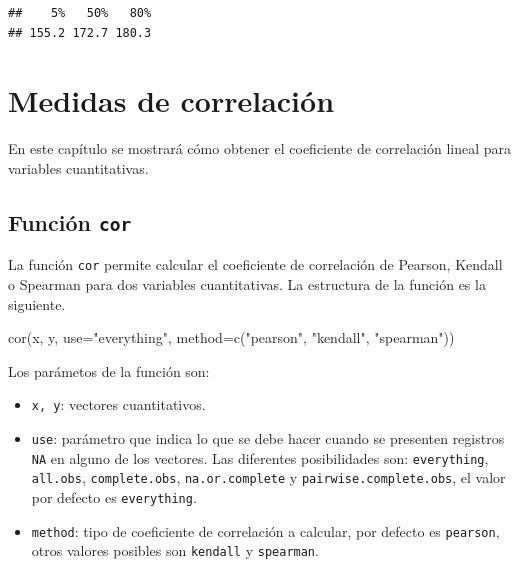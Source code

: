 \documentclass[
]{book}
\makeatletter
\newenvironment{Shaded}{\begin{snugshade}}{\end{snugshade}}
\newcommand{\AttributeTok}[1]{\textcolor[rgb]{0.77,0.63,0.00}{#1}}
\newcommand{\FloatTok}[1]{\textcolor[rgb]{0.00,0.00,0.81}{#1}}
\newcommand{\FunctionTok}[1]{\textcolor[rgb]{0.00,0.00,0.00}{#1}}
\newcommand{\NormalTok}[1]{#1}
\newcommand{\SpecialCharTok}[1]{\textcolor[rgb]{0.00,0.00,0.00}{#1}}
\newcommand{\StringTok}[1]{\textcolor[rgb]{0.31,0.60,0.02}{#1}}
\providecommand{\tightlist}{%
  \setlength{\itemsep}{0pt}\setlength{\parskip}{0pt}}
\newenvironment{kframe}{%
\medskip{}
\setlength{\fboxsep}{.8em}
 \def\at@end@of@kframe{}%
 \ifinner\ifhmode%
  \def\at@end@of@kframe{\end{minipage}}%
  \begin{minipage}{\columnwidth}%
 \fi\fi%
 \def\FrameCommand##1{\hskip\@totalleftmargin \hskip-\fboxsep
 \colorbox{shadecolor}{##1}\hskip-\fboxsep
     \hskip-\linewidth \hskip-\@totalleftmargin \hskip\columnwidth}%
 \MakeFramed {\advance\hsize-\width
   \@totalleftmargin\z@ \linewidth\hsize
   \@setminipage}}%
 {\par\unskip\endMakeFramed%
 \at@end@of@kframe}
\renewenvironment{Shaded}{\begin{kframe}}{\end{kframe}}
\makeatother
\begin{document}
\begin{Shaded}
\end{Shaded}

\begin{verbatim}
##    5%   50%   80% 
## 155.2 172.7 180.3
\end{verbatim}

\hypertarget{correl}{%
\chapter{Medidas de correlación}\label{correl}}

En este capítulo se mostrará cómo obtener el coeficiente de correlación lineal para variables cuantitativas.

\hypertarget{funciuxf3n-cor}{%
\section{\texorpdfstring{Función \texttt{cor}  }{Función cor  }}\label{funciuxf3n-cor}}

La función \texttt{cor} permite calcular el coeficiente de correlación de Pearson, Kendall o Spearman para dos variables cuantitativas. La estructura de la función es la siguiente.

\begin{Shaded}
\begin{Highlighting}[]
\FunctionTok{cor}\NormalTok{(x, y, }\AttributeTok{use=}\StringTok{"everything"}\NormalTok{,}
    \AttributeTok{method=}\FunctionTok{c}\NormalTok{(}\StringTok{"pearson"}\NormalTok{, }\StringTok{"kendall"}\NormalTok{, }\StringTok{"spearman"}\NormalTok{))}
\end{Highlighting}
\end{Shaded}

Los parámetos de la función son:

\begin{itemize}
\tightlist
\item
  \texttt{x,\ y}: vectores cuantitativos.
\item
  \texttt{use}: parámetro que indica lo que se debe hacer cuando se presenten registros \texttt{NA} en alguno de los vectores. Las diferentes posibilidades son: \texttt{everything}, \texttt{all.obs}, \texttt{complete.obs}, \texttt{na.or.complete} y \texttt{pairwise.complete.obs}, el valor por defecto es \texttt{everything}.
\item
  \texttt{method}: tipo de coeficiente de correlación a calcular, por defecto es \texttt{pearson}, otros valores posibles son \texttt{kendall} y \texttt{spearman}.
\end{itemize}
\end{document}
